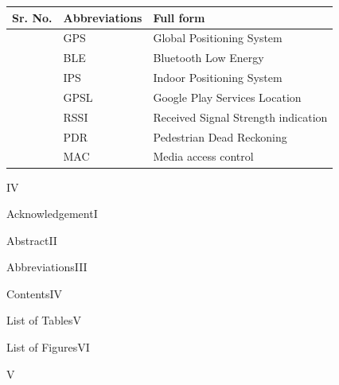﻿\documentclass[a4paper, 12pt]{article}
\begin{document}
{\raggedright
\vspace{3pt} \noindent \begin{tabular}{|p{100pt}|p{167pt}|p{148pt}|}
\hline
\parbox{100pt}{\centering \textbf{Sr. No.}} & 
\parbox{167pt}{\centering \textbf{Abbreviations}} & 
\parbox{148pt}{\centering \textbf{Full form}} \\
\hline
\parbox{100pt}{} & 
\parbox{167pt}{\centering GPS} & 
\parbox{148pt}{\centering Global Positioning System} \\
\hline
\parbox{100pt}{} & 
\parbox{167pt}{\centering BLE} & 
\parbox{148pt}{\centering Bluetooth Low Energy} \\
\hline
\parbox{100pt}{} & 
\parbox{167pt}{\centering IPS} & 
\parbox{148pt}{\centering Indoor Positioning System} \\
\hline
\parbox{100pt}{} & 
\parbox{167pt}{\centering GPSL} & 
\parbox{148pt}{\centering Google Play Services Location} \\
\hline
\parbox{100pt}{} & 
\parbox{167pt}{\centering RSSI} & 
\parbox{148pt}{\centering Received Signal Strength indication} \\
\hline
\parbox{100pt}{} & 
\parbox{167pt}{\centering PDR} & 
\parbox{148pt}{\centering Pedestrian Dead Reckoning} \\
\hline
\parbox{100pt}{} & 
\parbox{167pt}{\centering MAC} & 
\parbox{148pt}{\centering Media access control} \\
\hline


\end{tabular}
\vspace{2pt}

}
\newpage
\begin{center}
    IV
\end{center}
{\raggedright Acknowledgement\hspace{320pt}I}
\linebreak
{\raggedright Abstract\hspace{367pt}II}
\linebreak
{\raggedright Abbreviations\hspace{340pt}III}
\linebreak
{\raggedright Contents\hspace{365pt}IV}
\linebreak
{\raggedright List of Tables\hspace{343pt}V}
\linebreak
{\raggedright List of Figures\hspace{338pt}VI}
\linebreak
\tableofcontents
\newpage
\begin{center}
    V
\end{center}
\end{document}
